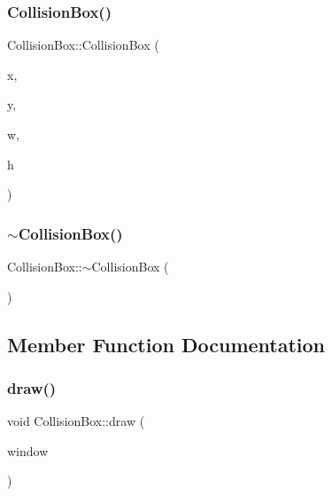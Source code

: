 \mbox{\label{class_collision_box_a0a5bd8a87ad2d2efd445588e5b568edc}} 
\subsubsection{\texorpdfstring{CollisionBox()}{CollisionBox()}\hspace{0.1cm}{\footnotesize\ttfamily [2/2]}}
{\footnotesize\ttfamily Collision\+Box\+::\+Collision\+Box (\begin{DoxyParamCaption}\item[{float}]{x,  }\item[{float}]{y,  }\item[{float}]{w,  }\item[{float}]{h }\end{DoxyParamCaption})}

\mbox{\label{class_collision_box_aeb743d5c3c5b54d2648281a4782f8a40}} 
\subsubsection{\texorpdfstring{$\sim$CollisionBox()}{~CollisionBox()}}
{\footnotesize\ttfamily Collision\+Box\+::$\sim$\+Collision\+Box (\begin{DoxyParamCaption}{ }\end{DoxyParamCaption})}



\subsection{Member Function Documentation}
\mbox{\label{class_collision_box_a6063d25f96262043ed68493a8f1152e6}} 
\subsubsection{\texorpdfstring{draw()}{draw()}}
{\footnotesize\ttfamily void Collision\+Box\+::draw (\begin{DoxyParamCaption}\item[{sf\+::\+Render\+Window \&}]{window }\end{DoxyParamCaption})}

